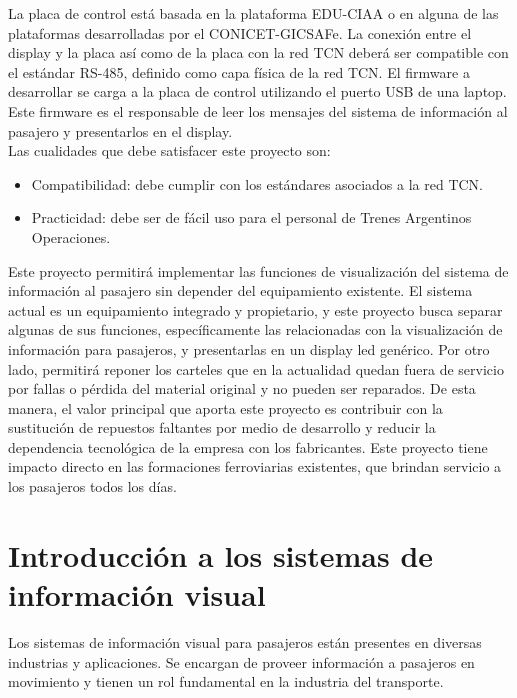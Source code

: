 La placa de control está basada en la plataforma EDU-CIAA \citep{proyecto-ciaa} o en alguna de las plataformas desarrolladas por el CONICET-GICSAFe. La conexión entre el display y la placa así como de la placa con la red TCN deberá ser compatible con el estándar RS-485, definido como capa física de la red TCN. El
firmware a desarrollar se carga a la placa de control utilizando el puerto USB de una laptop. Este firmware es el responsable de leer los mensajes del sistema de información al pasajero y presentarlos en el display.\\

Las cualidades que debe satisfacer este proyecto son:
\begin{itemize}
\item Compatibilidad: debe cumplir con los estándares asociados a la red TCN.
\item Practicidad: debe ser de fácil uso para el personal de Trenes Argentinos Operaciones.
\end{itemize}

Este proyecto permitirá implementar las funciones de visualización del sistema de información al pasajero sin depender del equipamiento existente. El sistema actual es un equipamiento integrado y propietario, y este proyecto busca separar algunas de sus funciones, específicamente las relacionadas con la visualización de información para pasajeros, y presentarlas en un display led genérico. Por otro lado, permitirá reponer los carteles que en la actualidad quedan fuera de servicio por fallas o pérdida del material original y no pueden ser reparados. De esta manera, el valor principal que aporta este proyecto es contribuir con la sustitución de repuestos faltantes por medio de desarrollo y reducir la dependencia tecnológica de la empresa con los fabricantes. Este proyecto tiene impacto directo en las formaciones ferroviarias existentes, que brindan servicio a los pasajeros todos los días.\\

\section{Introducción a los sistemas de información visual}

Los sistemas de información visual para pasajeros están presentes en diversas industrias y aplicaciones. Se encargan de proveer información a pasajeros en  movimiento y tienen un rol fundamental en la industria del transporte.\\

